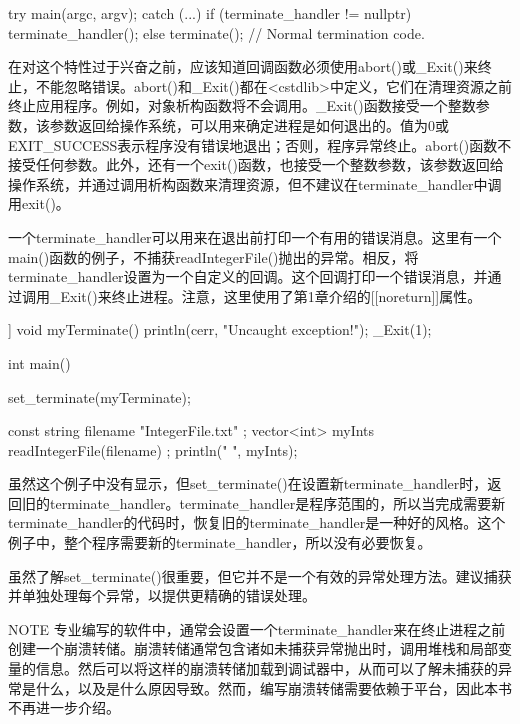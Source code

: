 \begin{cpp}
try {
    main(argc, argv);
} catch (...) {
    if (terminate_handler != nullptr) {
        terminate_handler();
    } else {
        terminate();
    }
}
// Normal termination code.
\end{cpp}

在对这个特性过于兴奋之前，应该知道回调函数必须使用abort()或\_Exit()来终止，不能忽略错误。abort()和\_Exit()都在<cstdlib>中定义，它们在清理资源之前终止应用程序。例如，对象析构函数将不会调用。\_Exit()函数接受一个整数参数，该参数返回给操作系统，可以用来确定进程是如何退出的。值为0或EXIT\_SUCCESS表示程序没有错误地退出；否则，程序异常终止。abort()函数不接受任何参数。此外，还有一个exit()函数，也接受一个整数参数，该参数返回给操作系统，并通过调用析构函数来清理资源，但不建议在terminate\_handler中调用exit()。

一个terminate\_handler可以用来在退出前打印一个有用的错误消息。这里有一个main()函数的例子，不捕获readIntegerFile()抛出的异常。相反，将terminate\_handler设置为一个自定义的回调。这个回调打印一个错误消息，并通过调用\_Exit()来终止进程。注意，这里使用了第1章介绍的[[noreturn]]属性。

\begin{cpp}
[[noreturn]] void myTerminate()
{
    println(cerr, "Uncaught exception!");
    _Exit(1);
}

int main()
{
    set_terminate(myTerminate);

    const string filename { "IntegerFile.txt" };
    vector<int> myInts { readIntegerFile(filename) };
    println("{} ", myInts);
}
\end{cpp}

虽然这个例子中没有显示，但set\_terminate()在设置新terminate\_handler时，返回旧的terminate\_handler。terminate\_handler是程序范围的，所以当完成需要新terminate\_handler的代码时，恢复旧的terminate\_handler是一种好的风格。这个例子中，整个程序需要新的terminate\_handler，所以没有必要恢复。

虽然了解set\_terminate()很重要，但它并不是一个有效的异常处理方法。建议捕获并单独处理每个异常，以提供更精确的错误处理。

\begin{myNotic}{NOTE}
专业编写的软件中，通常会设置一个terminate\_handler来在终止进程之前创建一个崩溃转储。崩溃转储通常包含诸如未捕获异常抛出时，调用堆栈和局部变量的信息。然后可以将这样的崩溃转储加载到调试器中，从而可以了解未捕获的异常是什么，以及是什么原因导致。然而，编写崩溃转储需要依赖于平台，因此本书不再进一步介绍。
\end{myNotic}

